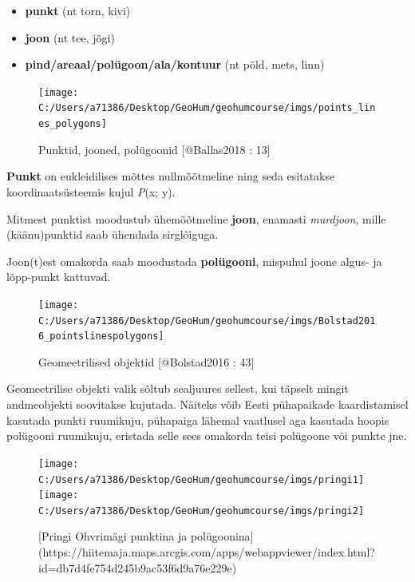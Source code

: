 \documentclass[
]{book}
\providecommand{\tightlist}{%
  \setlength{\itemsep}{0pt}\setlength{\parskip}{0pt}}
\begin{document}
\begin{itemize}
\tightlist
\item
  \textbf{punkt} (nt torn, kivi)\\
\item
  \textbf{joon} (nt tee, jõgi)\\
\item
  \textbf{pind/areaal/polügoon/ala/kontuur} (nt põld, mets, linn)
\end{itemize}

\begin{figure}

{\centering \texttt{[image: C:/Users/a71386/Desktop/GeoHum/geohumcourse/imgs/points\_lines\_polygons]} 

}

\caption{Punktid, jooned, polügoonid [@Ballas2018 : 13]}\label{fig:ruumiobjektid}
\end{figure}

\textbf{Punkt} on eukleidilises mõttes nullmõõtmeline ning seda esitatakse koordinaatsüsteemis kujul \emph{P}(x; y).

Mitmest punktist moodustub ühemõõtmeline \textbf{joon}, enamasti \emph{murdjoon}, mille (käänu)punktid saab ühendada sirglõiguga.

Joon(t)est omakorda saab moodustada \textbf{polügooni}, mispuhul joone algus- ja lõpp-punkt kattuvad.

\begin{figure}

{\centering \texttt{[image: C:/Users/a71386/Desktop/GeoHum/geohumcourse/imgs/Bolstad2016\_pointslinespolygons]} 

}

\caption{Geomeetrilised objektid [@Bolstad2016 : 43]}\label{fig:points-lines-polygons}
\end{figure}

Geomeetrilise objekti valik sõltub sealjuures sellest, kui täpselt mingit andmeobjekti soovitakse kujutada. Näiteks võib Eesti pühapaikade kaardistamisel kasutada punkti ruumikuju, pühapaiga lähemal vaatlusel aga kasutada hoopis polügooni ruumikuju, eristada selle sees omakorda teisi polügoone või punkte jne.

\begin{figure}

{\centering \texttt{[image: C:/Users/a71386/Desktop/GeoHum/geohumcourse/imgs/pringi1]} \texttt{[image: C:/Users/a71386/Desktop/GeoHum/geohumcourse/imgs/pringi2]} 

}

\caption{[Pringi Ohvrimägi punktina ja polügoonina](https://hiitemaja.maps.arcgis.com/apps/webappviewer/index.html?id=db7d4fe754d245b9ac53f6d9a76e229e)}\label{fig:pringi1}
\end{figure}
\end{document}
